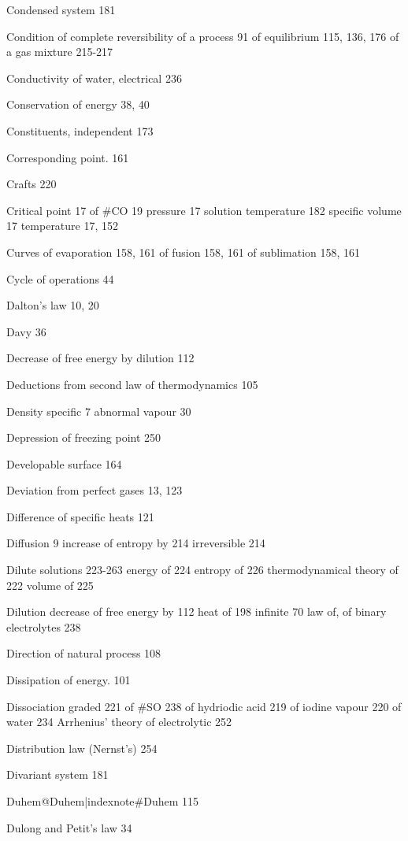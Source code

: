 \documentclass[12pt]{book}[2005/09/16]
\newcommand{\PageSep}[1]{\ignorespaces}
\begin{document}
Condensed system 181

Condition of complete reversibility
  of a process 91
  of equilibrium 115, 136, 176
  of a gas mixture 215-217

Conductivity of water, electrical 236

Conservation of energy 38, 40

Constituents, independent 173

Corresponding point. 161

Crafts 220

Critical point 17
  of #CO 19
  pressure 17
  solution temperature 182
  specific volume 17
  temperature 17, 152

Curves
  of evaporation 158, 161
  of fusion 158, 161
  of sublimation 158, 161

Cycle of operations 44



Dalton's law 10, 20

Davy 36

Decrease of free energy by dilution 112

Deductions from second law of thermodynamics 105

Density
  specific 7
  abnormal vapour 30

Depression of freezing point 250

Developable surface 164

Deviation from perfect gases 13, 123

Difference of specific heats 121

Diffusion 9
  increase of entropy by 214
  irreversible 214

Dilute solutions 223-263
  energy of 224
  entropy of 226
  thermodynamical theory of 222
  volume of 225

Dilution
  decrease of free energy by 112
  heat of 198
  infinite 70
  law of, of binary electrolytes 238

Direction of natural process 108

Dissipation of energy. 101

Dissociation
  graded 221
  of #SO 238
  of hydriodic acid 219
  of iodine vapour 220
  of water 234
  Arrhenius' theory of electrolytic 252

Distribution law (Nernst's) 254

Divariant system 181

Duhem@Duhem|indexnote#Duhem 115

Dulong and Petit's law 34
\end{document}
